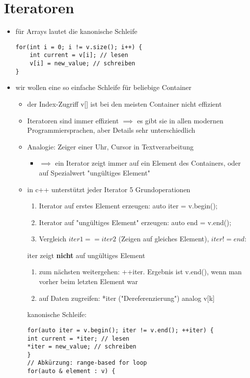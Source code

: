 \documentclass[a4paper]{scrartcl}
\theoremstyle{definition}
\theoremstyle{plain}
\theoremstyle{remark}
\theoremstyle{remark}
\begin{document}
\section{Iteratoren}
\label{sec-12}
\begin{itemize}
\item für Arrays lautet die kanonische Schleife
\begin{verbatim}
for(int i = 0; i != v.size(); i++) {
	int current = v[i]; // lesen
	v[i] = new_value; // schreiben
}
\end{verbatim}
\item wir wollen eine so einfache Schleife für beliebige Container
\begin{itemize}
\item der Index-Zugriff v[] ist bei den meisten Container nicht effizient
\item Iteratoren sind immer effizient $\implies$ es gibt sie in allen modernen Programmiersprachen, aber Details sehr unterschiedlich
\item Analogie: Zeiger einer Uhr, Cursor in Textverarbeitung
\begin{itemize}
\item $\implies$ ein Iterator zeigt immer auf ein Element des Containers, oder auf Spezialwert "ungültiges Element"
\end{itemize}
\item in c++ unterstützt jeder Iterator 5 Grundoperationen
\begin{enumerate}
\item Iterator auf erstes Element erzeugen: auto iter = v.begin();
\item Iterator auf "ungültiges Element" erzeugen: auto end = v.end();
\item Vergleich $iter1 == iter2$ (Zeigen auf gleiches Element), $iter != end$:
\end{enumerate}
iter zeigt \textbf{nicht} auf ungültiges Element
\begin{enumerate}
\item zum nächsten weitergehen: ++iter. Ergebnis ist v.end(), wenn man vorher beim letzten Element war
\item auf Daten zugreifen: *iter ("Dereferenzierung") analog v[k]
\end{enumerate}
kanonische Schleife:
\begin{verbatim}
for(auto iter = v.begin(); iter != v.end(); ++iter) {
int current = *iter; // lesen
*iter = new_value; // schreiben
}
// Abkürzung: range-based for loop
for(auto & element : v) {

\end{verbatim}
\end{itemize}
\end{itemize}
\end{document}
